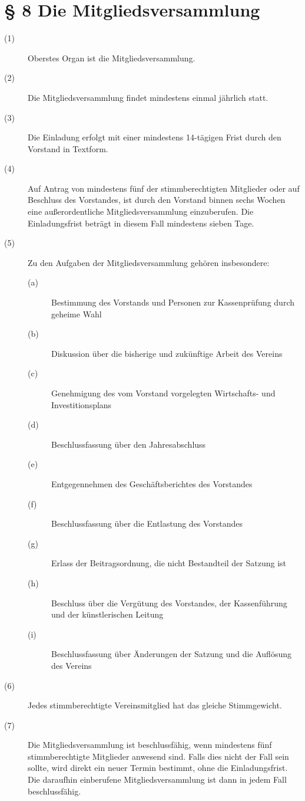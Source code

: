 \documentclass[a4paper,12pt]{scrartcl}
\begin{document}
\section*{\S{} 8 Die Mitgliedsversammlung}
\begin{description} 

\item[(1)] Oberstes Organ ist die Mitgliedsversammlung.
\item[(2)] Die Mitgliedsversammlung findet mindestens einmal jährlich statt.
\item[(3)] Die Einladung erfolgt mit einer mindestens 14-tägigen Frist durch den Vorstand in Textform.
\item[(4)] Auf Antrag von mindestens fünf der stimmberechtigten Mitglieder oder auf Beschluss des Vorstandes, ist durch den Vorstand binnen sechs Wochen eine außerordentliche Mitgliedsversammlung einzuberufen. Die Einladungsfrist beträgt in diesem Fall mindestens sieben Tage.
\item[(5)] Zu den Aufgaben der Mitgliedsversammlung gehören insbesondere:
\begin{description} 
\item[(a)] Bestimmung des Vorstands und Personen zur Kassenprüfung durch geheime Wahl
\item[(b)] Diskussion über die bisherige und zukünftige Arbeit des Vereins
\item[(c)] Genehmigung des vom Vorstand vorgelegten Wirtschafts- und Investitionsplans
\item[(d)] Beschlussfassung über den Jahresabschluss
\item[(e)] Entgegennehmen des Geschäftsberichtes des Vorstandes
\item[(f)] Beschlussfassung über die Entlastung des Vorstandes
\item[(g)] Erlass der Beitragsordnung, die nicht Bestandteil der Satzung ist
\item[(h)] Beschluss über die Vergütung des Vorstandes, der Kassenführung und der künstlerischen Leitung
\item[(i)] Beschlussfassung über Änderungen der Satzung und die Auflösung des Vereins 
\end{description}
\item[(6)] Jedes stimmberechtigte Vereinsmitglied hat das gleiche Stimmgewicht.
\item[(7)] Die Mitgliedsversammlung ist beschlussfähig, wenn mindestens fünf stimmberechtigte Mitglieder anwesend sind. Falls dies nicht der Fall sein sollte, wird direkt ein neuer Termin bestimmt, ohne die Einladungsfrist. Die daraufhin einberufene Mitgliedsversammlung ist dann in jedem Fall beschlussfähig.

\end{description}
\end{document}
